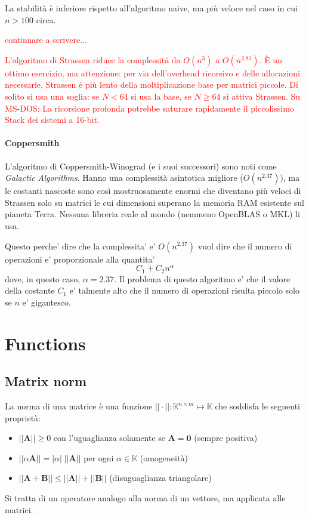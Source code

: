 \documentclass[10pt]{article}
\begin{document}
La stabilità è inferiore rispetto all'algoritmo naive, ma più veloce nel caso in cui $n>100$ circa.

\textcolor{red}{continuare a scrivere...}

\textcolor{red}{L'algoritmo di Strassen riduce la complessità da $O(n^3)$ a $O(n^{2.81})$. È un ottimo esercizio, ma attenzione: per via dell'overhead ricorsivo e delle allocazioni necessarie, Strassen è più lento della moltiplicazione base per matrici piccole. Di solito si usa una soglia: se $N < 64$ si usa la base, se $N \ge 64$ si attiva Strassen. Su MS-DOS: La ricorsione profonda potrebbe saturare rapidamente il piccolissimo Stack dei sistemi a 16-bit.}


\paragraph{Coppersmith}

L'algoritmo di Coppersmith-Winograd (e i suoi successori) sono noti come \textit{Galactic Algorithms}. Hanno una complessità asintotica migliore ($O(n^{2.37})$), ma le costanti nascoste sono così mostruosamente enormi che diventano più veloci di Strassen solo su matrici le cui dimensioni superano la memoria RAM esistente sul pianeta Terra. Nessuna libreria reale al mondo (nemmeno OpenBLAS o MKL) li usa.

Questo perche' dire che la complessita' e' $O(n^{2.37})$ vuol dire che il numero di operazioni e' proporzionale alla quantita'
$$ C_1 + C_2 n^\alpha $$
dove, in questo caso, $\alpha = 2.37$. Il problema di questo algoritmo e' che il valore della costante $C_1$ e' talmente alto che il numero di operazioni risulta piccolo solo se $n$ e' gigantesco.





\section{Functions}

\subsection{Matrix norm}

La norma di una matrice è una funzione $||\cdot|| : \mathbb{K}^{n\times m} \mapsto \mathbb{K}$ che soddisfa le seguenti proprietà:
\begin{itemize}[noitemsep]
\item $||\mathbf{A}|| \geq 0$ con l'uguaglianza solamente se $\mathbf{A}=\mathbf{0}$ (sempre positiva)
\item $||\alpha\mathbf{A}||=|\alpha| \; ||\mathbf{A}||$ per ogni $\alpha\in\mathbb{K}$ (omogeneità)
\item $||\mathbf{A}+\mathbf{B}||\leq ||\mathbf{A}||+||\mathbf{B}||$ (disuguaglianza triangolare)
\end{itemize}
Si tratta di un operatore analogo alla norma di un vettore, ma applicata alle matrici.
\end{document}
